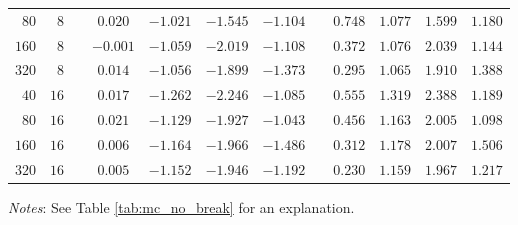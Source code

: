 \documentclass[12pt,fleqn]{article}
\begin{document}
\begin{table}[H]
\begin{tabular}{rrcccccccccc}
   {\small $80$} & {\small $8$} & {\small $$} & {\small $0.020$} & {\small $-1.021$} & {\small $-1.545$} & {\small $-1.104$} & {\small $$} & {\small $0.748$} & {\small $1.077$} & {\small $1.599$} & {\small $1.180$} \\
   {\small $160$} & {\small $8$} & {\small $$} & {\small $-0.001$} & {\small $-1.059$} & {\small $-2.019$} & {\small $-1.108$} & {\small $$} & {\small $0.372$} & {\small $1.076$} & {\small $2.039$} & {\small $1.144$} \\
   {\small $320$} & {\small $8$} & {\small $$} & {\small $0.014$} & {\small $-1.056$} & {\small $-1.899$} & {\small $-1.373$} & {\small $$} & {\small $0.295$} & {\small $1.065$} & {\small $1.910$} & {\small $1.388$} \\
   {\small $40$} & {\small $16$} & {\small $$} & {\small $0.017$} & {\small $-1.262$} & {\small $-2.246$} & {\small $-1.085$} & {\small $$} & {\small $0.555$} & {\small $1.319$} & {\small $2.388$} & {\small $1.189$} \\
   {\small $80$} & {\small $16$} & {\small $$} & {\small $0.021$} & {\small $-1.129$} & {\small $-1.927$} & {\small $-1.043$} & {\small $$} & {\small $0.456$} & {\small $1.163$} & {\small $2.005$} & {\small $1.098$} \\
   {\small $160$} & {\small $16$} & {\small $$} & {\small $0.006$} & {\small $-1.164$} & {\small $-1.966$} & {\small $-1.486$} & {\small $$} & {\small $0.312$} & {\small $1.178$} & {\small $2.007$} & {\small $1.506$} \\
   {\small $320$} & {\small $16$} & {\small $$} & {\small $0.005$} & {\small $-1.152$} & {\small $-1.946$} & {\small $-1.192$} & {\small $$} & {\small $0.230$} & {\small $1.159$} & {\small $1.967$} & {\small $1.217$} \\
  \hline\hline
  \end{tabular}
  \par
      \begin{tablenotes}[flushleft]\small
      \item \textit{Notes}: See Table \ref{tab:mc_no_break} for an explanation.
      \end{tablenotes}
  \end{table}
  
  
  
\end{document}
